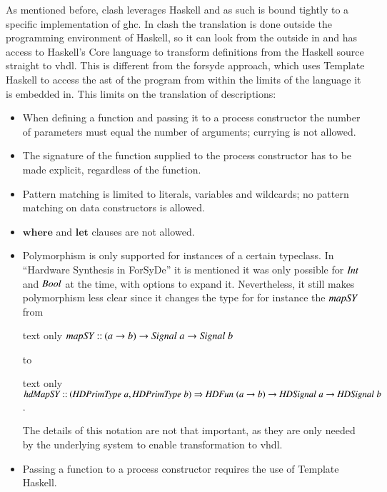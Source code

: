 As mentioned before, \gls{clash} leverages Haskell and as such is bound tightly to a specific implementation of \gls{ghc}.
In \gls{clash} the translation is done outside the programming environment of Haskell, so it can look from the outside in and has access to Haskell's Core language to transform definitions from the Haskell source straight to \gls{vhdl}.
This is different from the \gls{forsyde} approach, which uses Template Haskell to access the \gls{ast} of the program from within the limits of the language it is embedded in.
This limits on the translation of  descriptions:
\begin{itemize}
 \item When defining a function and passing it to a process constructor the number of parameters must equal the number of arguments; currying is not allowed.
 \item The signature of the function supplied to the process constructor has to be made explicit, regardless of the function.
 \item Pattern matching is limited to literals, variables and wildcards; no pattern matching on data constructors is allowed.
 \item \ensuremath{\mathbf{where}} and \ensuremath{\mathbf{let}} clauses are not allowed.
 \item Polymorphism is only supported for instances of a certain typeclass. 
 In ``Hardware Synthesis in ForSyDe''\cite{acosta2007hardware} it is mentioned it was only possible for \ensuremath{\Conid{Int}} and \ensuremath{\Conid{Bool}} at the time, with options to expand it. 
 Nevertheless, it still makes polymorphism less clear since it changes the type for for instance the \ensuremath{\Varid{mapSY}} from 
\begin{changemargin}{1cm}{0cm}
\begin{expansionno}{text only}
\ensuremath{\Varid{mapSY}\mathbin{::}(\Varid{a}\to \Varid{b})\to \Conid{Signal}\;\Varid{a}\to \Conid{Signal}\;\Varid{b}}
\end{expansionno}
\end{changemargin}
 to
\begin{changemargin}{1cm}{0cm}
\begin{expansionno}{text only}
\ensuremath{\Varid{hdMapSY}\mathbin{::}(\Conid{HDPrimType}\;\Varid{a},\Conid{HDPrimType}\;\Varid{b})\Rightarrow \Conid{HDFun}\;(\Varid{a}\to \Varid{b})\to \Conid{HDSignal}\;\Varid{a}\to \Conid{HDSignal}\;\Varid{b}}.
\end{expansionno}
\end{changemargin}
The details of this notation are not that important, as they are only needed by the underlying system to enable transformation to \gls{vhdl}.

 \item Passing a function to a process constructor requires the use of Template Haskell.
\end{itemize}

